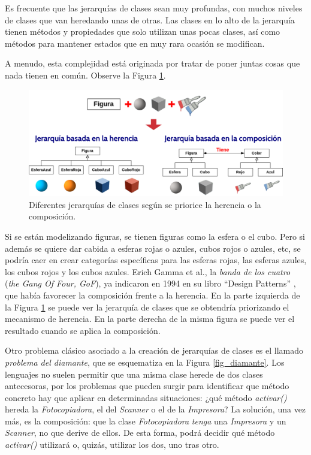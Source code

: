 Es frecuente que las jerarquías de clases sean muy profundas, con muchos niveles de clases que van heredando unas de otras. Las clases en lo alto de la jerarquía tienen métodos y propiedades que solo utilizan unas pocas clases, así como métodos para mantener estados que en muy rara ocasión se modifican. 

A menudo, esta complejidad está originada por tratar de poner juntas cosas que nada tienen en común. Observe la Figura \ref{fig_herencia_composicion}.

\begin{figure}[htb]
   \begin{center}
      \includegraphics[width=\textwidth]{img/herencia_composicion.png}
      \caption{Diferentes jerarquías de clases según se priorice la herencia o la composición.}
      \label{fig_herencia_composicion}
   \end{center}
\end{figure}

Si se están modelizando figuras, se tienen figuras como la esfera o el cubo. Pero si además se quiere dar cabida a esferas rojas o azules, cubos rojos o azules, etc, se podría caer en crear categorías específicas para las esferas rojas, las esferas azules, los cubos rojos y los cubos azules. Erich Gamma et al., la \textit{banda de los cuatro} (\textit{the Gang Of Four, GoF}), ya indicaron en 1994 en su libro ``Design Patterns''  \citep{gammaDesignPatternsElements1994}, que había favorecer la composición frente a la herencia. En la parte izquierda de la Figura \ref{fig_herencia_composicion} se puede ver la jerarquía de clases que se obtendría priorizando el mecanismo de herencia. En la parte derecha de la misma figura se puede ver el resultado cuando se aplica la composición. 

Otro problema clásico asociado a la creación de jerarquías de clases es el llamado \textit{problema del diamante}, que se esquematiza en la Figura \ref{fig_diamante}. Los lenguajes no suelen permitir que una misma clase herede de dos clases antecesoras, por los problemas que pueden surgir para identificar que método concreto hay que aplicar en determinadas situaciones: ¿qué método \textit{activar()} hereda la \textit{Fotocopiadora}, el del \textit{Scanner} o el de la \textit{Impresora}? La solución, una vez más, es la composición: que la clase \textit{Fotocopiadora} \textit{tenga} una \textit{Impresora} y un \textit{Scanner}, no que derive de ellos. De esta forma, podrá decidir qué método \textit{activar()} utilizará o, quizás, utilizar los dos, uno tras otro.

